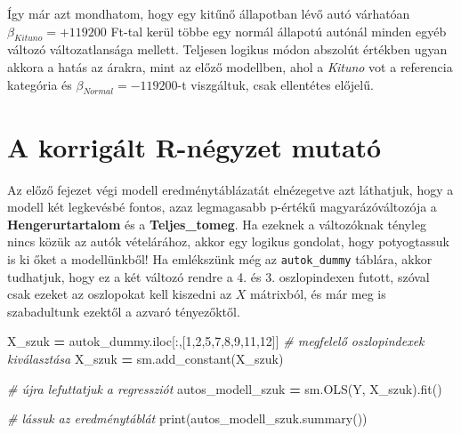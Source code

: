 \documentclass[
]{book}
\newenvironment{Shaded}{\begin{snugshade}}{\end{snugshade}}
\newcommand{\BuiltInTok}[1]{#1}
\newcommand{\CommentTok}[1]{\textcolor[rgb]{0.56,0.35,0.01}{\textit{#1}}}
\newcommand{\DecValTok}[1]{\textcolor[rgb]{0.00,0.00,0.81}{#1}}
\newcommand{\NormalTok}[1]{#1}
\newcommand{\OperatorTok}[1]{\textcolor[rgb]{0.81,0.36,0.00}{\textbf{#1}}}
\begin{document}
Így már azt mondhatom, hogy egy kitűnő állapotban lévő autó várhatóan \(\beta_{Kituno}=+119200\) Ft-tal kerül többe egy normál állapotú autónál minden egyéb változó változatlansága mellett. Teljesen logikus módon abszolút értékben ugyan akkora a hatás az árakra, mint az előző modellben, ahol a \emph{Kituno} vot a referencia kategória és \(\beta_{Normal}=-119200\)-t viszgáltuk, csak ellentétes előjelű.

\section{A korrigált R-négyzet mutató}\label{a-korriguxe1lt-r-nuxe9gyzet-mutatuxf3}

Az előző fejezet végi modell eredménytáblázatát elnézegetve azt láthatjuk, hogy a modell két legkevésbé fontos, azaz legmagasabb p-értékű magyarázóváltozója a \textbf{Hengerurtartalom} és a \textbf{Teljes\_tomeg}. Ha ezeknek a változóknak tényleg nincs közük az autók vételárához, akkor egy logikus gondolat, hogy potyogtassuk is ki őket a modellünkből! Ha emlékszünk még az \texttt{autok\_dummy} táblára, akkor tudhatjuk, hogy ez a két változó rendre a 4. és 3. oszlopindexen futott, szóval csak ezeket az oszlopokat kell kiszedni az \(X\) mátrixból, és már meg is szabadultunk ezektől a azvaró tényezőktől.

\begin{Shaded}
\begin{Highlighting}[]
\NormalTok{X\_szuk }\OperatorTok{=}\NormalTok{ autok\_dummy.iloc[:,[}\DecValTok{1}\NormalTok{,}\DecValTok{2}\NormalTok{,}\DecValTok{5}\NormalTok{,}\DecValTok{7}\NormalTok{,}\DecValTok{8}\NormalTok{,}\DecValTok{9}\NormalTok{,}\DecValTok{11}\NormalTok{,}\DecValTok{12}\NormalTok{]] }\CommentTok{\# megfelelő oszlopindexek kiválasztása}
\NormalTok{X\_szuk }\OperatorTok{=}\NormalTok{ sm.add\_constant(X\_szuk)}

\CommentTok{\# újra lefuttatjuk a regressziót}
\NormalTok{autos\_modell\_szuk }\OperatorTok{=}\NormalTok{ sm.OLS(Y, X\_szuk).fit()}

\CommentTok{\# lássuk az eredménytáblát}
\BuiltInTok{print}\NormalTok{(autos\_modell\_szuk.summary())}
\end{Highlighting}
\end{Shaded}
\end{document}
